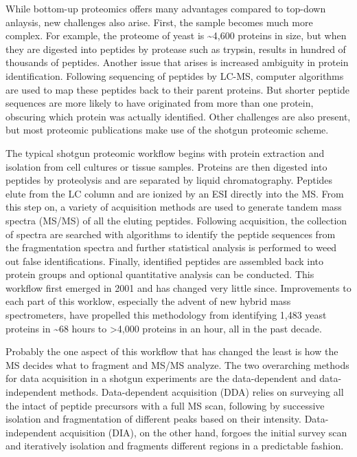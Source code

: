 While bottom-up proteomics offers many advantages compared to top-down anlaysis, new challenges also arise. First, the sample becomes much more complex. For example, the proteome of yeast is \textasciitilde4,600 proteins in size, but when they are digested into peptides by protease such as trypsin, results in hundred of thousands of peptides. Another issue that arises is increased ambiguity in protein identification. Following sequencing of peptides by LC-MS, computer algorithms are used to map these peptides back to their parent proteins. But shorter peptide sequences are more likely to have originated from more than one protein, obscuring which protein was actually identified. Other challenges are also present, but most proteomic publications make use of the shotgun proteomic scheme.

The typical shotgun proteomic workflow begins with protein extraction and isolation from cell cultures or tissue samples. Proteins are then digested into peptides by proteolysis and are separated by liquid chromatography. Peptides elute from the LC column and are ionized by an ESI directly into the MS. From this step on, a variety of acquisition methods are used to generate tandem mass spectra (MS/MS) of all the eluting peptides. Following acquisition, the collection of spectra are searched with algorithms to identify the peptide sequences from the fragmentation spectra and further statistical analysis is performed to weed out false identifications. Finally, identified peptides are assembled back into protein groups and optional quantitative analysis can be conducted. This workflow first emerged in 2001 and has changed very little since.\cite{mudpit} Improvements to each part of this worklow, especially the advent of new hybrid mass spectrometers, have propelled this methodology from identifying 1,483 yeast proteins in \textasciitilde68 hours to >4,000 proteins in an hour, all in the past decade.\cite{onehour}

Probably the one aspect of this workflow that has changed the least is how the MS decides what \mz{} to fragment and MS/MS analyze. The two overarching methods for data acquisition in a shotgun experiments are the data-dependent and data-independent methods. Data-dependent acquisition (DDA) relies on surveying all the intact \mz{} of peptide precursors with a full MS scan, following by successive isolation and fragmentation of different \mz{} peaks based on their intensity.\cite{dda1,dda2} Data-independent acquisition (DIA), on the other hand, forgoes the initial survey scan and iteratively isolation and fragments different \mz{} regions in a predictable fashion.\cite{dia1,dia2}

